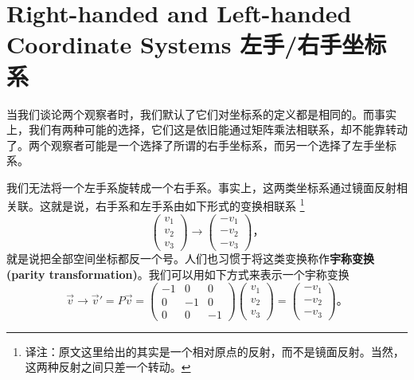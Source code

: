 \section[左手/右手坐标系]{Right-handed and Left-handed Coordinate Systems 左手/右手坐标系}\label{appendix.A.5}
当我们谈论两个观察者时，我们默认了它们对坐标系的定义都是相同的。而事实上，我们有两种可能的选择，它们这是依旧能通过矩阵乘法相联系，却不能靠转动了。两个观察者可能是一个选择了所谓的右手坐标系，而另一个选择了左手坐标系。


我们无法将一个左手系旋转成一个右手系。事实上，这两类坐标系通过镜面反射相关联。这就是说，右手系和左手系由如下形式的变换相联系%
\footnote{译注：原文这里给出的其实是一个相对原点的反射，而不是镜面反射。当然，这两种反射之间只差一个转动。}
\begin{equation}
\begin{pmatrix}
v_1 \\ v_2 \\ v_3
\end{pmatrix} \rightarrow
\begin{pmatrix}
-v_1 \\ -v_2 \\ -v_3
\end{pmatrix}\text{，}
\end{equation}
就是说把全部空间坐标都反一个号。人们也习惯于将这类变换称作{\bfseries 宇称变换(parity transformation)}。我们可以用如下方式来表示一个宇称变换
\begin{equation}
\vec{v} \rightarrow \vec{v}' = P\vec{v} = \begin{pmatrix}
-1 & 0 & 0 \\ 0 & -1 & 0 \\ 0 & 0 & -1
\end{pmatrix}
\begin{pmatrix}
v_1 \\ v_2 \\ v_3
\end{pmatrix} =
\begin{pmatrix}
-v_1 \\ -v_2 \\ -v_3
\end{pmatrix}\text{。}
\end{equation}

